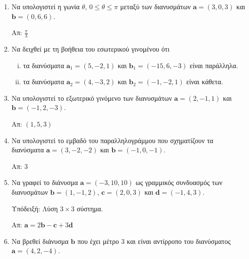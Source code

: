 


\pagestyle{askhseis}

\renewcommand{\vec}{\mathbf}



\begin{center}
  \minibox{\large \bfseries \textcolor{Col1}{Ασκήσεις στα Διανύσματα}}
\end{center}

\vspace{\baselineskip}

\begin{enumerate}

	\item Να υπολογιστεί η γωνία $ \theta $, $ 0\leq \theta \leq \pi $ μεταξύ των διανυσμάτων $
		\vec{a} = (3,0,3) $ και $ \vec{b} = (0,6,6) $.

		\hfill Απ: $ \frac{\pi}{3} $

	\item Να δειχθεί με τη βοήθεια του εσωτερικού γινομένου ότι
		\begin{enumerate}[i)]
			\item τα διανύσματα $ \vec{a}_1 = (5,-2,1) $ και $ \vec{b}_1 = (-15,6,-3) $ είναι παράλληλα.
			\item τα διανύσματα $ \vec{a}_2 = (4,-3,2) $ και $ \vec{b}_2 = (-1,-2,1) $ είναι κάθετα.
		\end{enumerate}

	\item Να υπολογιστεί το εξωτερικό γινόμενο των διανυσμάτων $ \vec{a} = (2,-1,1) $ και $ \vec{b} = (-1,2,-3) $.

		\hfill Απ: $ (1,5,3) $

	\item Να υπολογιστεί το εμβαδό του παραλληλογράμμου που σχηματίζουν τα διανύσματα $ \vec{a} = (3,-2,-2) $ και $ \vec{b} = (-1,0,-1) $.

		\hfill Απ: $3 $ 
	\item Να γραφεί το διάνυσμα $ \vec{a}=(-3,10,10) $ ως γραμμικός συνδυασμός των διανυσμάτων $\vec{b}=(1,-1,2)$, $ \vec{c}=(2,0,3) $ και $ \vec{d}=(-1,4,3) $.  

		\hfill Υπόδειξή: Λύση $ 3\times 3 $ σύστημα. 

		\hfill Απ: $ \vec{a}=2\vec{b}-\vec{c}+3\vec{d} $

	\item Να βρεθεί διάνυσμα $ \vec{b} $ που έχει μέτρο $3$ και είναι αντίρροπο του διανύσματος $ \vec{a}=(4,2,-4)$.


\end{enumerate}
